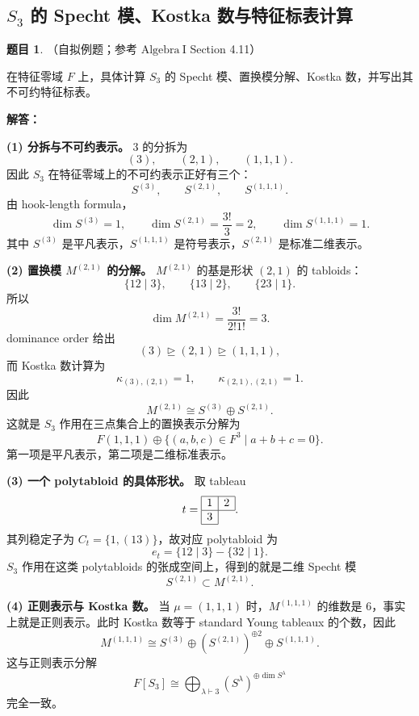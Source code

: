 \documentclass[a4paper]{ctexart}
\theoremstyle{definition}
\newtheorem{example}{题目}[section]
\theoremstyle{analysis}
\theoremstyle{plain}
\begin{document}
\newpage
\subsection{\texorpdfstring{\(S_3\) 的 Specht 模、Kostka 数与特征标表计算}{S3 的 Specht 模、Kostka 数与特征标表计算}}
\label{subsec:problem-s3-specht-kostka}

\begin{example}
（自拟例题；参考 \(\mathrm{Algebra\ I}\) Section 4.11）

在特征零域 \(F\) 上，具体计算 \(S_3\) 的 Specht 模、置换模分解、Kostka 数，并写出其不可约特征标表。

\textbf{解答：}

\textbf{(1) 分拆与不可约表示。}
\(3\) 的分拆为
\[
  (3),\qquad (2,1),\qquad (1,1,1).
\]
因此 \(S_3\) 在特征零域上的不可约表示正好有三个：
\[
  S^{(3)},\qquad S^{(2,1)},\qquad S^{(1,1,1)}.
\]
由 hook-length formula，
\[
  \dim S^{(3)}=1,\qquad
  \dim S^{(2,1)}=\frac{3!}{3}=2,\qquad
  \dim S^{(1,1,1)}=1.
\]
其中 \(S^{(3)}\) 是平凡表示，\(S^{(1,1,1)}\) 是符号表示，\(S^{(2,1)}\) 是标准二维表示。

\textbf{(2) 置换模 \(M^{(2,1)}\) 的分解。}
\(M^{(2,1)}\) 的基是形状 \((2,1)\) 的 tabloids：
\[
  \{12\mid 3\},\qquad
  \{13\mid 2\},\qquad
  \{23\mid 1\}.
\]
所以
\[
  \dim M^{(2,1)}=\frac{3!}{2!1!}=3.
\]
dominance order 给出
\[
  (3)\trianglerighteq (2,1)\trianglerighteq (1,1,1),
\]
而 Kostka 数计算为
\[
  \kappa_{(3),(2,1)}=1,\qquad
  \kappa_{(2,1),(2,1)}=1.
\]
因此
\[
  M^{(2,1)}\cong S^{(3)}\oplus S^{(2,1)}.
\]
这就是 \(S_3\) 作用在三点集合上的置换表示分解为
\[
  F(1,1,1)\oplus \{(a,b,c)\in F^3\mid a+b+c=0\}.
\]
第一项是平凡表示，第二项是二维标准表示。

\textbf{(3) 一个 polytabloid 的具体形状。}
取 tableau
\[
  t=
  \begin{array}{|c|c|}
  \hline
  1&2\\
  \hline
  3\\
  \cline{1-1}
  \end{array}.
\]
其列稳定子为 \(C_t=\{1,(13)\}\)，故对应 polytabloid 为
\[
  e_t=\{12\mid 3\}-\{32\mid 1\}.
\]
\(S_3\) 作用在这类 polytabloids 的张成空间上，得到的就是二维 Specht 模
\[
  S^{(2,1)}\subset M^{(2,1)}.
\]

\textbf{(4) 正则表示与 Kostka 数。}
当 \(\mu=(1,1,1)\) 时，\(M^{(1,1,1)}\) 的维数是 \(6\)，事实上就是正则表示。此时 Kostka 数等于 standard Young tableaux 的个数，因此
\[
  M^{(1,1,1)}
  \cong
  S^{(3)}
  \oplus
  (S^{(2,1)})^{\oplus 2}
  \oplus
  S^{(1,1,1)}.
\]
这与正则表示分解
\[
  F[S_3]\cong \bigoplus_{\lambda\vdash 3}(S^\lambda)^{\oplus \dim S^\lambda}
\]
完全一致。


\end{example}
\end{document}
